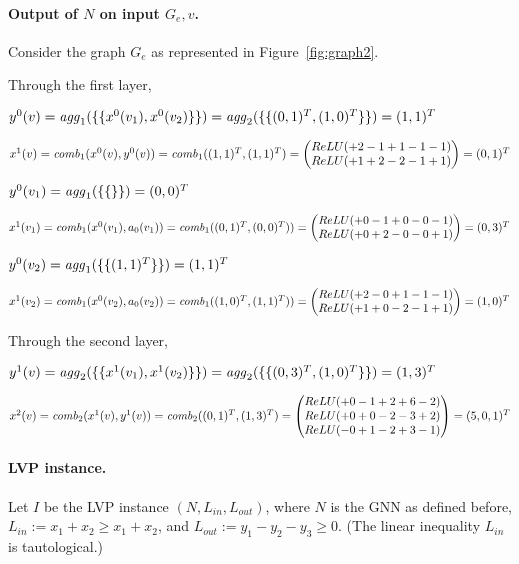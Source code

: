 \paragraph{Output of $N$ on input $G_e, v$.}
Consider the graph $G_e$ as represented in Figure~\ref{fig:graph2}.

Through the first layer,

$y^0(v) 
= \mathit{agg}_1(\{\{ x^0(v_1), x^0(v_2) \}\}) 
= \mathit{agg}_2 (\{\{ (0, 1)^T, (1, 0)^T \}\}) 
= (1,1)^T$

$x^1(v) 
= \mathit{comb}_1(x^0(v), y^0(v)) 
= \mathit{comb}_1((1, 1)^T, (1, 1)^T) 
=  \begin{pmatrix}
    ReLU(+2 - 1 + 1 - 1 - 1) \\
    ReLU(+1 + 2 - 2 - 1 + 1)
    \end{pmatrix} 
= (0, 1)^T$


$y^0(v_1) 
= \mathit{agg}_1(\{\{  \}\}) = (0, 0)^T$

$x^1(v_1) 
= \mathit{comb}_1(x^0(v_1), a_0(v_1))
= \mathit{comb}_1((0,1)^T, (0, 0)^T))
= \begin{pmatrix}
    ReLU(+0 - 1 + 0 - 0 - 1) \\
    ReLU(+0 + 2 - 0 - 0 + 1)
    \end{pmatrix}
= (0, 3)^T$

$y^0(v_2)
= \mathit{agg}_1(\{\{ (1,1)^T \}\}) = (1, 1)^T$

$x^1(v_2)
= \mathit{comb}_1(x^0(v_2), a_0(v_2))
= \mathit{comb}_1((1,0)^T, (1, 1)^T))
= \begin{pmatrix}
    ReLU(+2 - 0 + 1 - 1 - 1) \\
    ReLU(+1 + 0 - 2 - 1 + 1)
    \end{pmatrix}
= (1, 0)^T$


Through the second layer,

$y^1(v) 
= \mathit{agg}_2(\{\{ x^1(v_1), x^1(v_2) \}\})
= \mathit{agg}_2(\{\{ (0,3)^T, (1,0)^T \}\})
= (1,3)^T$

$x^2 (v) 
= \mathit{comb}_2(x^1(v), y^1(v))
= \mathit{comb}_2((0,1)^T, (1,3)^T)
= \begin{pmatrix}
    ReLU(+0 - 1 + 2 + 6 - 2) \\
    ReLU(+0 + 0 - 2 - 3 + 2) \\
    ReLU(-0 + 1 - 2 + 3 - 1)
    \end{pmatrix}
= (5,0,1)^T$



\paragraph{LVP instance.}
Let $I$ be the LVP instance $(N, L_{in}, L_{out})$, where $N$ is the GNN as defined before, $L_{in} := x_1 + x_2 \geq x_1 + x_2$, and $L_{out} := y_1 - y_2 - y_3 \geq 0$. (The linear inequality $L_{in}$ is tautological.)

